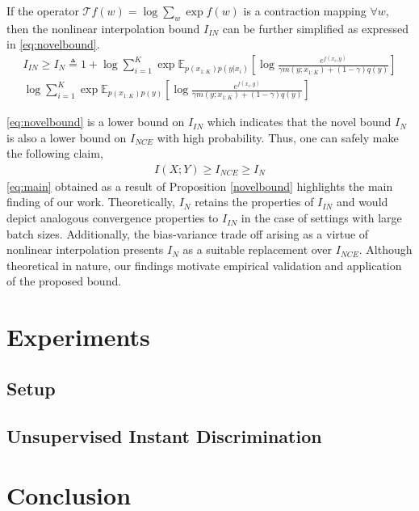 \documentclass{article}
\begin{document}
\begin{customthm}{3}\label{novelbound}
  If the operator $\mathcal{T}f(w)=\log \sum_{w} \exp{f(w)}$ is a contraction mapping $\forall w$, then the nonlinear interpolation bound $I_{IN}$ can be further simplified as expressed in \autoref{eq:novelbound}. 
\begin{multline}  
  I_{IN} \geq I_{N} \triangleq 1 + \log \sum_{i=1}^{K} \exp{\mathbb{E}_{p(x_{1:K})p(y|x_{i})}[\log\frac{e^{f(x_{i},y)}}{\gamma m(y;x_{1:K})+(1-\gamma)q(y)}]}\\ \log \sum_{i=1}^{K} \exp{\mathbb{E}_{p(x_{1:K})p(y)}[\log\frac{e^{f(x_{i},y)}}{\gamma m(y;x_{1:K})+(1-\gamma)q(y)}]} \label{eq:novelbound}
\end{multline} 
\label{novelbound} 
\end{customthm}
\autoref{eq:novelbound} is a lower bound on $I_{IN}$ which indicates that the novel bound $I_{N}$ is also a lower bound on $I_{NCE}$ with high probability. Thus, one can safely make the following claim,
\begin{gather}
  I(X;Y) \geq I_{NCE} \geq I_{N} \label{eq:main}
\end{gather}
\autoref{eq:main} obtained as a result of Proposition \autoref{novelbound} highlights the main finding of our work. Theoretically, $I_{N}$ retains the properties of $I_{IN}$ and would depict analogous convergence properties to $I_{IN}$ in the case of settings with large batch sizes. Additionally, the bias-variance trade off arising as a virtue of nonlinear interpolation presents $I_{N}$ as a suitable replacement over $I_{NCE}$. Although theoretical in nature, our findings motivate empirical validation and application of the proposed bound.

\section{Experiments}
\subsection{Setup}

\subsection{Unsupervised Instant Discrimination}

\section{Conclusion}

 
\small{}

% 
\end{document}
